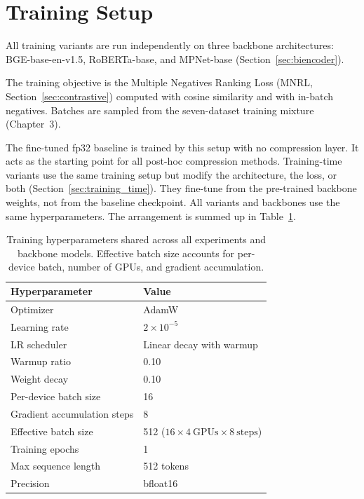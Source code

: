 \section{Training Setup}
\label{sec:training_infra}

All training variants are run independently on three backbone architectures:
BGE-base-en-v1.5, RoBERTa-base, and MPNet-base
(Section~\ref{sec:biencoder}).

The training objective is the Multiple Negatives Ranking Loss (MNRL,
Section~\ref{sec:contrastive}) computed with cosine similarity and with
in-batch negatives. Batches are sampled from the seven-dataset training
mixture (Chapter~3).

The fine-tuned fp32 baseline is trained by this setup with no compression
layer. It acts as the starting point for all post-hoc compression methods.
Training-time variants use the same training setup but modify the
architecture, the loss, or both (Section~\ref{sec:training_time}). They
fine-tune from the pre-trained backbone weights, not from the baseline
checkpoint. All variants and backbones use the same hyperparameters. The
arrangement is summed up in Table~\ref{tab:hyperparams}.

\begin{table}[H]
  \centering
  \caption[Training hyperparameters.]{Training hyperparameters shared across all experiments and backbone models. Effective batch size accounts for per-device batch, number of GPUs, and gradient accumulation.}
  \label{tab:hyperparams}
  \begin{tabular}{| l | l |}
    \hline
    \textbf{Hyperparameter}     & \textbf{Value} \\ [0.5ex] \hline
    Optimizer                   & AdamW \\ \hline
    Learning rate               & $2\times10^{-5}$ \\ \hline
    LR scheduler                & Linear decay with warmup \\ \hline
    Warmup ratio                & 0.10 \\ \hline
    Weight decay                & 0.10 \\ \hline
    Per-device batch size       & 16 \\ \hline
    Gradient accumulation steps & 8 \\ \hline
    Effective batch size        & 512 \quad ($16 \times 4\ \text{GPUs} \times 8\ \text{steps}$) \\ \hline
    Training epochs             & 1 \\ \hline
    Max sequence length         & 512 tokens \\ \hline
    Precision                   & bfloat16 \\ \hline
  \end{tabular}
\end{table}


